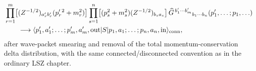 \begin{theorem}
\begin{equation}
\begin{aligned}
&\prod_{r=1}^m
  \bigl[(Z^{-1/2})_{a'_r b'_r}(p'_r{}^2+m_r^2)\bigr]
 \prod_{s=1}^n
  \bigl[(p_s^2+m_s^2)(Z^{-1/2})_{b_s a_s}\bigr]
  \,\widehat G^{\,b'_1\cdots b'_m}{}_{b_1\cdots b_n}
     (p'_1,\ldots;p_1,\ldots)
\\
&\qquad\longrightarrow
  \langle
    p'_1,a'_1;\ldots;p'_m,a'_m,{\rm out}
  |S|
    p_1,a_1;\ldots;p_n,a_n,{\rm in}
  \rangle_{\rm conn},
  \label{eq:finite-regulator-dressed-lsz-formula}
\end{aligned}
\end{equation}
after wave-packet smearing and removal of the total momentum-conservation
delta distribution, with the same connected/disconnected convention as in the
ordinary LSZ chapter.
\end{theorem}

